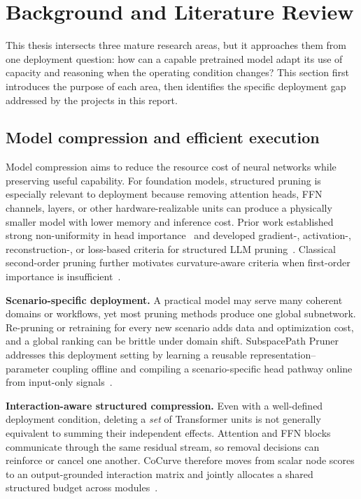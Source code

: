 \documentclass[12pt,a4paper]{article}
\newcommand{\method}[1]{{\sffamily\bfseries\color{MethodBlue}#1}}
\newcommand{\XDB}{\method{XDomainBench}}
\newcommand{\SubspacePath}{\method{SubspacePath Pruner}}
\newcommand{\CoCurve}{\method{CoCurve}}
\newcommand{\AnchorPath}{\method{AnchorPath}}
\newcommand{\CoAx}{\method{CoAx}}
\def\method#1{#1}\def\XDB{XDomainBench}\def\SubspacePath{SubspacePath Pruner}%
\def\CoCurve{CoCurve}\def\AnchorPath{AnchorPath}\def\CoAx{CoAx}%
\begin{document}
\clearpage
\section{Background and Literature Review}
\label{sec:lit}

This thesis intersects three mature research areas, but it approaches them from one deployment question: how can a capable pretrained model adapt its use of capacity and reasoning when the operating condition changes? This section first introduces the purpose of each area, then identifies the specific deployment gap addressed by the projects in this report.

\subsection{Model compression and efficient execution}
Model compression aims to reduce the resource cost of neural networks while preserving useful capability. For foundation models, structured pruning is especially relevant to deployment because removing attention heads, FFN channels, layers, or other hardware-realizable units can produce a physically smaller model with lower memory and inference cost. Prior work established strong non-uniformity in head importance~\citep{michel2019sixteen,voita2019heads} and developed gradient-, activation-, reconstruction-, or loss-based criteria for structured LLM pruning~\citep{ma2023llmpruner,an2024flap,ashkboos2024slicegpt}. Classical second-order pruning further motivates curvature-aware criteria when first-order importance is insufficient~\citep{lecun1989obd,hassibi1993obs}.

\textbf{Scenario-specific deployment.} A practical model may serve many coherent domains or workflows, yet most pruning methods produce one global subnetwork. Re-pruning or retraining for every new scenario adds data and optimization cost, and a global ranking can be brittle under domain shift. \SubspacePath{} addresses this deployment setting by learning a reusable representation--parameter coupling offline and compiling a scenario-specific head pathway online from input-only signals~\citep{gong2026subspacepath}.

\textbf{Interaction-aware structured compression.} Even with a well-defined deployment condition, deleting a \emph{set} of Transformer units is not generally equivalent to summing their independent effects. Attention and FFN blocks communicate through the same residual stream, so removal decisions can reinforce or cancel one another. \CoCurve{} therefore moves from scalar node scores to an output-grounded interaction matrix and jointly allocates a shared structured budget across modules~\citep{gong2026cocurve}.
\end{document}
